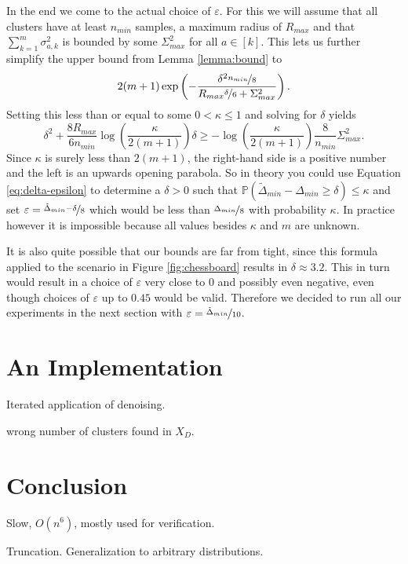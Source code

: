 \documentclass[10pt,a4paper]{article}
\begin{document}
In the end we come to the actual choice of $\varepsilon$.
For this we will assume that all clusters have at least $n_{min}$ samples, a maximum radius of $R_{max}$ and that $\sum_{k = 1}^{m} \sigma_{a,k}^{2}$ is bounded by some $\Sigma_{max}^{2}$ for all $a \in [k]$.
This lets us further simplify the upper bound from Lemma \ref{lemma:bound} to
\begin{equation*}
  2(m + 1)\exp\left( -\frac{\delta^{2} \nicefrac{n_{min}}{8}}{R_{max} \nicefrac{\delta}{6} + \Sigma_{max}^{2}} \right).
\end{equation*}
Setting this less than or equal to some $0 < \kappa \le 1$ and solving for $\delta$ yields
\begin{equation}
  \delta^{2} + \frac{8R_{max}}{6n_{min}}\log\left( \frac{\kappa}{2(m + 1)} \right)\delta \ge -\log\left( \frac{\kappa}{2(m + 1)} \right)\frac{8}{n_{min}}\Sigma_{max}^{2}.
  \label{eq:delta-epsilon}
\end{equation}
Since $\kappa$ is surely less than $2(m + 1)$, the right-hand side is a positive number and the left is an upwards opening parabola.
So in theory you could use Equation \eqref{eq:delta-epsilon} to determine a $\delta > 0$ such that $\mathbb{P}(\tilde{\Delta}_{min} - \Delta_{min} \ge \delta) \le \kappa$ and set $\varepsilon = \nicefrac{\tilde{\Delta}_{min} - \delta}{8}$ which would be less than $\nicefrac{\Delta_{min}}{8}$ with probability $\kappa$.
In practice however it is impossible because all values besides $\kappa$ and $m$ are unknown.

It is also quite possible that our bounds are far from tight, since this formula applied to the scenario in Figure \ref{fig:chessboard} results in $\delta \approx 3.2$.
This in turn would result in a choice of $\varepsilon$ very close to $0$ and possibly even negative, even though choices of $\varepsilon$ up to $0.45$ would be valid.
Therefore we decided to run all our experiments in the next section with $\varepsilon = \nicefrac{\tilde{\Delta}_{min}}{10}$.

\section{An Implementation}
\label{sec:results}

Iterated application of denoising.

wrong number of clusters found in $X_{D}$.

\section{Conclusion}
\label{sec:conclusion}

Slow, $O(n^{6})$, mostly used for verification.

Truncation.
Generalization to arbitrary distributions.

{}

\end{document}
